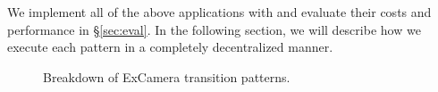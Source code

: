 We implement all of the above applications with \name{} and evaluate their
costs and performance in \S\ref{sec:eval}. In the following section, we will
describe how we execute each pattern in a completely decentralized manner.

\begin{figure}[t!]
	\centering
	\caption{Breakdown of ExCamera transition patterns. }
	\label{fig:excamera}
\end{figure}


